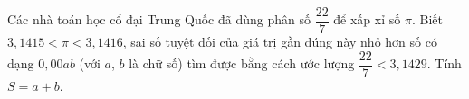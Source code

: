 \begin{ex}
Các nhà toán học cổ đại Trung Quốc đã dùng phân số $\dfrac{22}{7}$ để xấp xỉ số $\pi$. Biết $3{,}1415<\pi<3{,}1416$, sai số tuyệt đối của giá trị gần đúng này nhỏ hơn số có dạng $0{,}00ab$ (với $a$, $b$ là chữ số) tìm được bằng cách ước lượng $\dfrac{22}7<3{,}1429$. Tính $S=a+b$.
\end{ex}
